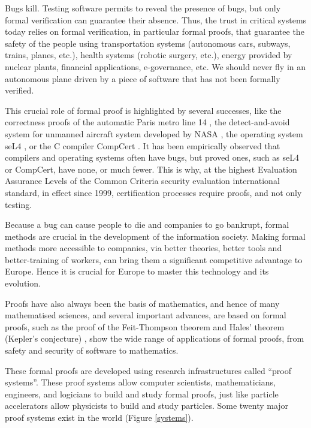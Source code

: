 \thispagestyle{empty}

Bugs kill.  Testing software permits to reveal the presence of bugs,
but only formal verification can guarantee their absence.  Thus, the
trust in critical systems today relies on formal verification, in
particular formal proofs, that guarantee the safety of the people
using transportation systems (autonomous cars, subways, trains,
planes, etc.), health systems (robotic surgery, etc.), energy provided
by nuclear plants, financial applications, e-governance, etc.  We
should never fly in an autonomous plane driven by a piece of software
that has not been formally verified.

This crucial role of formal proof is highlighted by several successes,
like the correctness proofs of the automatic Paris metro line 14
\cite{metro14}, the detect-and-avoid system for unmanned aircraft
system developed by NASA \cite{Munoz16}, the operating system seL4
\cite{Klein09}, or the C compiler CompCert \cite{Leroy06}.  It has
been empirically observed that compilers and operating systems often
have bugs, but proved ones, such as seL4 or CompCert, have none, or
much fewer.  This is why, at the highest Evaluation Assurance Levels
of the Common Criteria security evaluation international standard, in
effect since 1999, certification processes require proofs, and not
only testing.

Because a bug can cause people to die and companies to go bankrupt,
formal methods are crucial in the development of the information
society. Making formal methods more accessible to companies, via
better theories, better tools and better-training of workers, can
bring them a significant competitive advantage to Europe.  Hence it is
crucial for Europe to master this technology and its evolution.

Proofs have also always been the basis of mathematics, and hence of
many mathematised sciences, and several important advances, are based
on formal proofs, such as the proof of the Feit-Thompson theorem
\cite{Gonthier13} and Hales' theorem (Kepler's conjecture)
\cite{Hales17}, show the wide range of applications of formal proofs,
from safety and security of software to mathematics.

These formal proofs are developed using research infrastructures called
``proof systems''.  These proof systems allow computer scientists,
mathematicians, engineers, and logicians to build and study formal
proofs, just like particle accelerators allow physicists to build and
study particles.  Some twenty major proof systems exist in the world
(Figure \ref{systems}).

